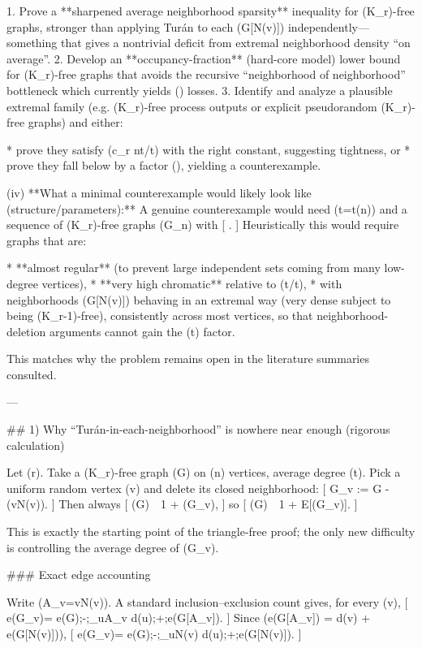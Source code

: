 1. Prove a **sharpened average neighborhood sparsity** inequality for (K_r)-free graphs, stronger than applying Turán to each (G[N(v)]) independently—something that gives a nontrivial deficit from extremal neighborhood density “on average”.
2. Develop an **occupancy-fraction** (hard-core model) lower bound for (K_r)-free graphs that avoids the recursive “neighborhood of neighborhood” bottleneck which currently yields (\log\log) losses.
3. Identify and analyze a plausible extremal family (e.g. (K_r)-free process outputs or explicit pseudorandom (K_r)-free graphs) and either:

   * prove they satisfy (\alpha \ge c_r n\log t/t) with the right constant, suggesting tightness, or
   * prove they fall below by a factor (), yielding a counterexample.

(iv) **What a minimal counterexample would likely look like (structure/parameters):**
A genuine counterexample would need (t=t(n)\to\infty) and a sequence of (K_r)-free graphs (G_n) with
[
.
]
Heuristically this would require graphs that are:

* **almost regular** (to prevent large independent sets coming from many low-degree vertices),
* **very high chromatic** relative to (t/\log t),
* with neighborhoods (G[N(v)]) behaving in an extremal way (very dense subject to being (K_{r-1})-free), consistently across most vertices, so that neighborhood-deletion arguments cannot gain the (\log t) factor.

This matches why the problem remains open in the literature summaries consulted.

---

## 1) Why “Turán-in-each-neighborhood” is nowhere near enough (rigorous calculation)

Let (r). Take a (K_r)-free graph (G) on (n) vertices, average degree (t). Pick a uniform random vertex (v) and delete its closed neighborhood:
[
G_v := G - ({v}\cup N(v)).
]
Then always
[
\alpha(G)\ \ge\ 1 + \alpha(G_v),
]
so
[
\alpha(G)\ \ge\ 1 + \mathbb E[\alpha(G_v)].
]

This is exactly the starting point of the triangle-free proof; the only new difficulty is controlling the average degree of (G_v).

### Exact edge accounting

Write (A_v={v}\cup N(v)). A standard inclusion–exclusion count gives, for every (v),
[
e(G_v)= e(G);-;\sum_{u\in A_v} d(u);+;e(G[A_v]).
]
Since (e(G[A_v]) = d(v) + e(G[N(v)])),
[
e(G_v)= e(G);-;\sum_{u\in N(v)} d(u);+;e(G[N(v)]).
]

